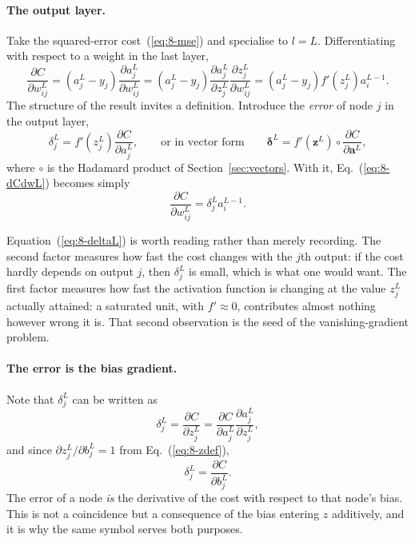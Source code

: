 \paragraph{The output layer.}
Take the squared-error cost~(\ref{eq:8-mse}) and specialise to $l=L$.
Differentiating with respect to a weight in the last layer,
\begin{equation}
  \frac{\partial C}{\partial w_{ij}^{L}}
   = \left(a_j^{L}-y_j\right)\frac{\partial a_j^{L}}{\partial w_{ij}^{L}}
   = \left(a_j^{L}-y_j\right)
     \frac{\partial a_j^{L}}{\partial z_j^{L}}
     \frac{\partial z_j^{L}}{\partial w_{ij}^{L}}
   = \left(a_j^{L}-y_j\right)f'\!\left(z_j^{L}\right)a_i^{L-1}.
  \label{eq:8-dCdwL}
\end{equation}
The structure of the result invites a definition.  Introduce the \emph{error}
of node $j$ in the output layer,
\begin{equation}
  \delta_j^{L}
   = f'\!\left(z_j^{L}\right)\frac{\partial C}{\partial a_j^{L}},
  \qquad\text{or in vector form}\qquad
  \bm{\delta}^{L} = f'\!\left(\bm{z}^{L}\right)\circ
    \frac{\partial C}{\partial \bm{a}^{L}},
  \label{eq:8-deltaL}
\end{equation}
where $\circ$ is the Hadamard product of Section~\ref{sec:vectors}.  With it,
Eq.~(\ref{eq:8-dCdwL}) becomes simply
\begin{equation}
  \frac{\partial C}{\partial w_{ij}^{L}} = \delta_j^{L}a_i^{L-1}.
  \label{eq:8-dCdwLcompact}
\end{equation}

Equation~(\ref{eq:8-deltaL}) is worth reading rather than merely recording.
The second factor measures how fast the cost changes with the $j$th output: if
the cost hardly depends on output $j$, then $\delta_j^{L}$ is small, which is
what one would want.  The first factor measures how fast the activation
function is changing at the value $z_j^{L}$ actually attained: a saturated unit,
with $f'\approx0$, contributes almost nothing however wrong it is.  That second
observation is the seed of the vanishing-gradient problem.

\paragraph{The error is the bias gradient.}
Note that $\delta_j^{L}$ can be written as
\begin{equation}
  \delta_j^{L} = \frac{\partial C}{\partial z_j^{L}}
   = \frac{\partial C}{\partial a_j^{L}}\frac{\partial a_j^{L}}{\partial z_j^{L}},
  \label{eq:8-deltaasdCdz}
\end{equation}
and since $\partial z_j^{L}/\partial b_j^{L}=1$ from Eq.~(\ref{eq:8-zdef}),
\begin{equation}
  \delta_j^{L} = \frac{\partial C}{\partial b_j^{L}} .
  \label{eq:8-deltaisbias}
\end{equation}
The error of a node \emph{is} the derivative of the cost with respect to that
node's bias.  This is not a coincidence but a consequence of the bias entering
$z$ additively, and it is why the same symbol serves both purposes.

